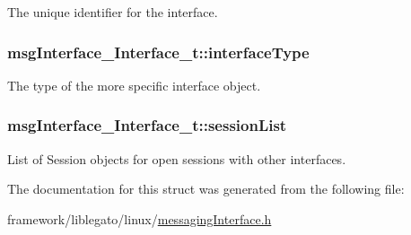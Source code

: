 The unique identifier for the interface. 

\subsubsection[{\texorpdfstring{interface\+Type}{interfaceType}}]{ msg\+Interface\+\_\+\+Interface\+\_\+t\+::interface\+Type}\hypertarget{structmsg_interface___interface__t_ab2c296a242642ead984eda4cc6442436}{}\label{structmsg_interface___interface__t_ab2c296a242642ead984eda4cc6442436}


The type of the more specific interface object. 

\subsubsection[{\texorpdfstring{session\+List}{sessionList}}]{ msg\+Interface\+\_\+\+Interface\+\_\+t\+::session\+List}\hypertarget{structmsg_interface___interface__t_a626f96166ff7adf4b8627a572194d274}{}\label{structmsg_interface___interface__t_a626f96166ff7adf4b8627a572194d274}
List of Session objects for open sessions with other interfaces. 

The documentation for this struct was generated from the following file\+:\begin{DoxyCompactItemize}
\item 
framework/liblegato/linux/\hyperlink{messaging_interface_8h}{messaging\+Interface.\+h}\end{DoxyCompactItemize}

